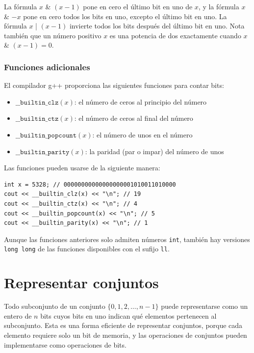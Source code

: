 La fórmula $x$ \& $(x-1)$ pone en cero el último
bit en uno de $x$,
y la fórmula $x$ \& $-x$ pone en cero todos los
bits en uno, excepto el último bit en uno.
La fórmula $x$ | $(x-1)$
invierte todos los bits después del último bit en uno.
Nota también que un número positivo $x$ es
una potencia de dos exactamente cuando $x$ \& $(x-1) = 0$.

\subsubsection*{Funciones adicionales}

El compilador g++ proporciona las siguientes
funciones para contar bits:

\begin{itemize}
\item
$\texttt{\_\_builtin\_clz}(x)$:
el número de ceros al principio del número
\item
$\texttt{\_\_builtin\_ctz}(x)$:
el número de ceros al final del número
\item
$\texttt{\_\_builtin\_popcount}(x)$:
el número de unos en el número
\item
$\texttt{\_\_builtin\_parity}(x)$:
la paridad (par o impar) del número de unos
\end{itemize}
\begin{samepage}

Las funciones pueden usarse de la siguiente manera:
\begin{lstlisting}
int x = 5328; // 00000000000000000001010011010000
cout << __builtin_clz(x) << "\n"; // 19
cout << __builtin_ctz(x) << "\n"; // 4
cout << __builtin_popcount(x) << "\n"; // 5
cout << __builtin_parity(x) << "\n"; // 1
\end{lstlisting}
\end{samepage}

Aunque las funciones anteriores solo admiten números \texttt{int},
también hay versiones \texttt{long long} de
las funciones disponibles con el sufijo \texttt{ll}.

\section{Representar conjuntos}

Todo subconjunto de un conjunto
$\{0,1,2,\ldots,n-1\}$
puede representarse como un entero de $n$ bits
cuyos bits en uno indican qué
elementos pertenecen al subconjunto.
Esta es una forma eficiente de representar conjuntos,
porque cada elemento requiere solo un bit de memoria,
y las operaciones de conjuntos pueden implementarse como operaciones de bits.

